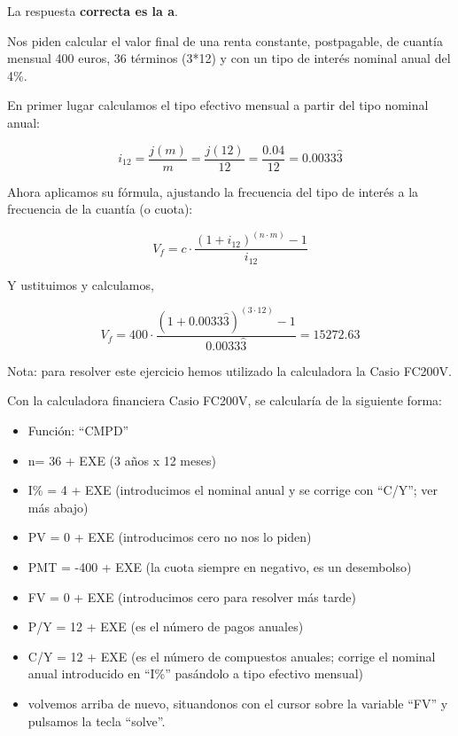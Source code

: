 \documentclass[
  letterpaper,
  DIV=11,
  numbers=noendperiod]{scrreprt}
\begin{document}
\begin{tcolorbox}[enhanced jigsaw, left=2mm, opacityback=0, colback=white, breakable, arc=.35mm, bottomrule=.15mm, rightrule=.15mm, toprule=.15mm, leftrule=.75mm, colframe=quarto-callout-tip-color-frame]
\begin{minipage}[t]{5.5mm}
\textcolor{quarto-callout-tip-color}{\faLightbulb}
\end{minipage}%
\begin{minipage}[t]{\textwidth - 5.5mm}

La respuesta \textbf{correcta es la a}.

Nos piden calcular el valor final de una renta constante, postpagable,
de cuantía mensual 400 euros, 36 términos (3*12) y con un tipo de
interés nominal anual del 4\%.

En primer lugar calculamos el tipo efectivo mensual a partir del tipo
nominal anual:

\[i_{12}=\frac{j\left(m\right)}{m}=\frac{j\left(12\right)}{12}=\frac{0.04}{12}=0.0033\hat {3  } \]

Ahora aplicamos su fórmula, ajustando la frecuencia del tipo de interés
a la frecuencia de la cuantía (o cuota):

\[V_f=c\cdot\frac{\left(1+i_{12}\right)^{(n \cdot m)}-1}{i_{12}}\]

Y ustituimos y calculamos,

\[V_f=400\cdot\frac{\left(1+0.0033\hat {3  }\right)^{(3\cdot 12)}-1}{0.0033\hat {3  }}=15272.63\]

Nota: para resolver este ejercicio hemos utilizado la calculadora la
Casio FC200V.

Con la calculadora financiera Casio FC200V, se calcularía de la
siguiente forma:

\begin{itemize}
\item
  Función: ``CMPD''
\item
  n= 36 + EXE (3 años x 12 meses)
\item
  I\% = 4 + EXE (introducimos el nominal anual y se corrige con ``C/Y'';
  ver más abajo)
\item
  PV = 0 + EXE (introducimos cero no nos lo piden)
\item
  PMT = -400 + EXE (la cuota siempre en negativo, es un desembolso)
\item
  FV = 0 + EXE (introducimos cero para resolver más tarde)
\item
  P/Y = 12 + EXE (es el número de pagos anuales)
\item
  C/Y = 12 + EXE (es el número de compuestos anuales; corrige el nominal
  anual introducido en ``I\%'' pasándolo a tipo efectivo mensual)
\item
  volvemos arriba de nuevo, situandonos con el cursor sobre la variable
  ``FV'' y pulsamos la tecla ``solve''.
\end{itemize}


\end{minipage}
\end{tcolorbox}
\end{document}

